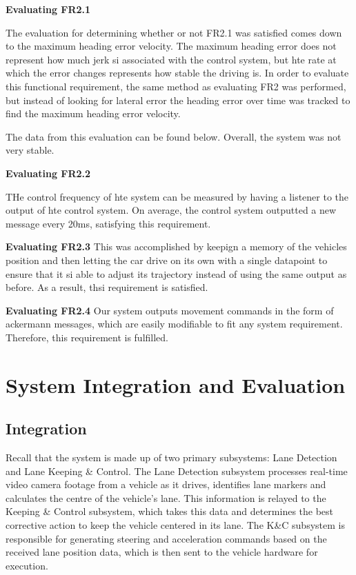 \documentclass[titlepage]{article}
\begin{document}
\textbf{Evaluating FR2.1}

The evaluation for determining whether or not FR2.1 was satisfied comes down to the maximum heading error velocity. The maximum heading error does not represent how much jerk si associated with the control system, but hte rate at which the error changes represents how stable the driving is. In order to evaluate this functional requirement, the same method as evaluating FR2 was performed, but instead of looking for lateral error the heading error over time was tracked to find the maximum heading error velocity.

The data from this evaluation can be found below. Overall, the system was not very stable.

\textbf{Evaluating FR2.2}

THe control frequency of hte system can be measured by having a listener to the output of hte control system. On average, the control system outputted a new message every 20ms, satisfying this requirement.

\textbf{Evaluating FR2.3}
This was accomplished by keepign a memory of the vehicles position and then letting the car drive on its own with a single datapoint to ensure that it si able to adjust its trajectory instead of using the same output as before. As a result, thsi requirement is satisfied.

\textbf{Evaluating FR2.4}
Our system outputs movement commands in the form of ackermann messages, which are easily modifiable to fit any system requirement. Therefore, this requirement is fulfilled.


\section{System Integration and Evaluation}

\subsection{Integration}
Recall that the system is made up of two primary subsystems: Lane Detection and Lane Keeping \& Control. The Lane Detection subsystem processes real-time video camera footage from a vehicle as it drives, identifies lane markers and calculates the centre of the vehicle’s lane. This information is relayed to the Keeping \& Control subsystem, which takes this data and determines the best corrective action to keep the vehicle centered in its lane. The K\&C subsystem is responsible for generating steering and acceleration commands based on the received lane position data, which is then sent to the vehicle hardware for execution.
\end{document}
